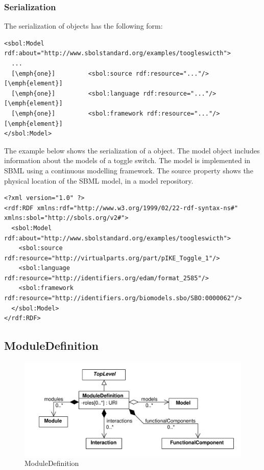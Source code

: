 \subsubsection*{Serialization}

The serialization of  objects has the following form:

\begin{lstlisting}
<sbol:Model rdf:about="http://www.sbolstandard.org/examples/toogleswicth">
  ...
  [\emph{one}]         <sbol:source rdf:resource="..."/> [\emph{element}]
  [\emph{one}]         <sbol:language rdf:resource="..."/> [\emph{element}]
  [\emph{one}]         <sbol:framework rdf:resource="..."/> [\emph{element}]
</sbol:Model>
\end{lstlisting}

The example below shows the serialization of a  object. The model object includes information about the models of a toggle switch. The model is implemented in SBML using a continuous modelling framework. The source property shows the physical location of the SBML model, in a model repository. 
\begin{lstlisting}
<?xml version="1.0" ?>
<rdf:RDF xmlns:rdf="http://www.w3.org/1999/02/22-rdf-syntax-ns#" xmlns:sbol="http://sbols.org/v2#">
  <sbol:Model rdf:about="http://www.sbolstandard.org/examples/toogleswicth">
    <sbol:source rdf:resource="http://virtualparts.org/part/pIKE_Toggle_1"/>
    <sbol:language rdf:resource="http://identifiers.org/edam/format_2585"/>
    <sbol:framework rdf:resource="http://identifiers.org/biomodels.sbo/SBO:0000062"/>
  </sbol:Model>
</rdf:RDF>

\end{lstlisting}
\label{ser:Model}

\subsection{ModuleDefinition}
\label{sec:ModuleDefinition}


\begin{figure}[ht]
\begin{center}
\includegraphics[scale=0.6]{uml/module_definition}
\caption[]{ModuleDefinition}
\label{uml:module_definition}
\end{center}
\end{figure}

